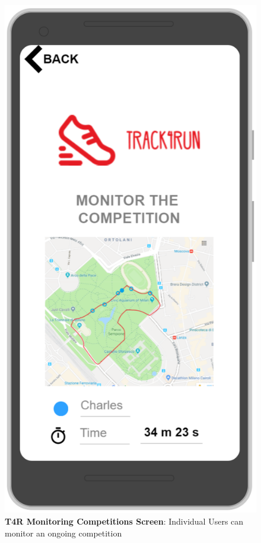 \begin{figure}[H]
\centering
\includegraphics[scale = 0.5]{Mocks/Mobile_T4R_Monitoring.PNG}
\caption{\textbf{T4R Monitoring Competitions Screen}: Individual Users can monitor an ongoing competition}
\end{figure}
\clearpage
